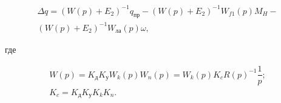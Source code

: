 \begin{comment}
\begin{equation}%
\label{eq:p4:415}
\begin{alignedat}{2}
\Delta  \alpha =\frac{1}{1+W_{1} \left( p \right) } \alpha _{\textit{пр}}-\frac{W_{f1} \left( p \right) }{1+W_{1} \left( p \right) }M_{H1}-\frac{W_{ \psi } \left( p \right) }{1+W_{1} \left( p \right) } \dot \psi,
\end{alignedat}
\end{equation}
\end{comment}

\begin{equation}%
\label{eq:p4:415}
\begin{alignedat}{2}
\Delta  q = 
(W(p)+E_2)^{-1} q _{\textit{пр}}-
(W(p)+E_2)^{-1} W_{f1} \left( p \right) M_{H}-\\
(W(p)+E_2)^{-1} W_{\textit{ла}} (p) \omega,
\end{alignedat}
\end{equation}

где 
\begin{comment}
\begin{equation}
\label{eq:p4:415+}
\begin{alignedat}{2}
 W_{1} \left( p \right) =
 K_{\textit{д1}}K_{\textit{у1}}W_{k1} \left( p \right) W_{n1} \left( p \right) =
 W_{k1} \left( p \right) \frac{K_{c1}}{ \left( T_{M1}T_{e1}p^{2}+T_{M1}p+1 \right) p}; \\
  K_{c1}=K_{\textit{д1}}K_{\textit{у1}}K_{k1}K_{n1}.
\end{alignedat}
\end{equation}
\end{comment}
\begin{equation}
\label{eq:p4:415+}
\begin{alignedat}{2}
W \left( p \right) =
K_{\textit{д}}K_{\textit{у}}W_{k} \left( p \right) W_{n} \left( p \right) =
W_{k} \left( p \right) K_{c} R(p)^{-1}  \dfrac{1}{p}; \\
K_{c}=K_{\textit{д}}K_{\textit{у}}K_{k}K_{n}.
\end{alignedat}
\end{equation}

